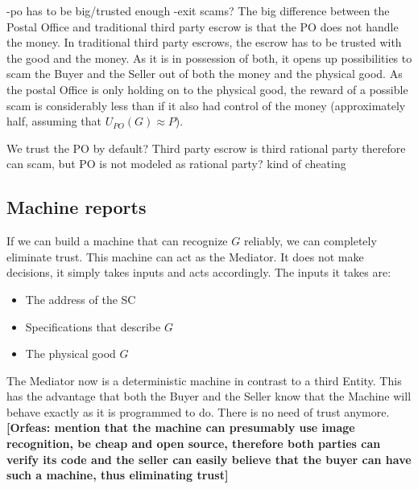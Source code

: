 \documentclass{cacthesis}
\newcommand{\authnote}[3]{{ \footnotesize \textbf{#1[#2: #3]~}}}
\newcommand{\orfnote}[1]{\authnote{\color{blue}}{Orfeas}{#1}}
\begin{document}
-po has to be big/trusted enough\newline
-exit scams?
The big difference between the Postal Office and traditional third party escrow is that the PO does not handle the money. 
In traditional third party escrows, the escrow has to be trusted with the good and the money. As it is in possession of both, it opens up possibilities to scam the Buyer and the Seller out of both the money and the physical good.
As the postal Office is only holding on to the physical good, the reward of a
possible scam is considerably less than if it also had control of the money (approximately half, assuming that $U_{PO}(G) \approx P$). \newline 

We trust the PO by default? Third party escrow is third rational party therefore can scam, but PO is not modeled as rational party? kind of cheating
\subsection{Machine reports}
If we can build a machine that can recognize $G$ reliably, we can completely eliminate trust. This machine can act as the Mediator. It does not make decisions, it simply takes inputs and acts accordingly.\newline
The inputs it takes are:
\begin{itemize}
    \item The address of the SC
    \item Specifications that describe $G$
    \item The physical good $G$
\end{itemize}

The Mediator now is a deterministic machine in contrast to a third Entity. This
has the advantage that both the Buyer and the Seller know that the Machine will
behave exactly as it is programmed to do. There is no need of trust anymore.
\orfnote{mention that the machine can presumably use image recognition, be cheap
and open source, therefore both parties can verify its code and the seller can
easily believe that the buyer can have such a machine, thus eliminating trust}\newline
\end{document}
